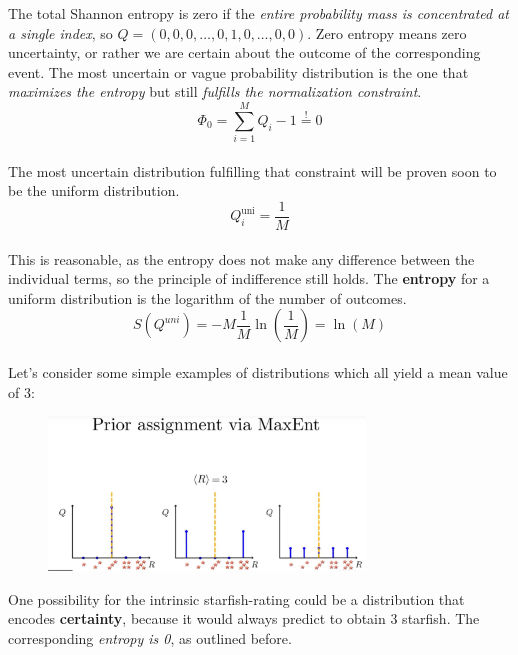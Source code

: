 \documentclass[12pt, a4paper]{scrartcl}
\begin{document}
The total Shannon entropy is zero if the \textit{entire probability mass is concentrated at a single index}, so $Q=(0,0,0, \ldots,0,1,0,\ldots, 0,0)$.
Zero entropy means zero uncertainty, or rather we are certain about the
outcome of the corresponding event. The most uncertain or vague probability
distribution is the one that \textit{maximizes the entropy} but still \textit{fulfills the
normalization constraint}.
\begin{equation*}\boxed{\Phi_0=\sum_{i=1}^MQ_i-1\stackrel{!}{=}0
}\end{equation*}\\
The most uncertain distribution fulfilling that constraint will be proven soon
to be the uniform distribution.\\
\begin{equation*}\boxed{Q_i^{\text{uni}}=\frac 1M
}\end{equation*}\\
This is reasonable, as
the entropy does not make any difference between the individual terms, so the principle of indifference still holds.
The \textbf{entropy} for a uniform distribution is the logarithm of the number of
outcomes.\\

\begin{equation*}\boxed{S(Q^{uni})=-M\frac 1M \ln\left(\frac 1M\right)=\ln(M)
}\end{equation*}\\

Let’s consider some simple examples of distributions which all yield a
mean value of 3:\\ %
 \begin{figure}[H]
	\centering
	\includegraphics[width=0.75\textwidth]{6_4.png}
\end{figure}

One possibility for the intrinsic starfish-rating could be a distribution
that encodes \textbf{certainty}, because it would always predict to obtain 3 starfish.
The corresponding \textit{entropy is 0}, as outlined before.
\end{document}
